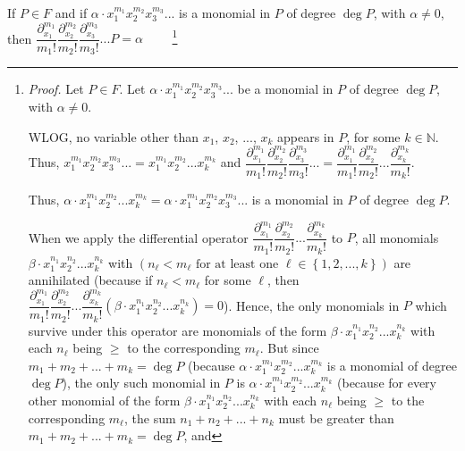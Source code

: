 \documentclass[etingof-lie.tex]{subfiles}
\begin{document}
\begin{vershort}
If $P\in F$ and if $\alpha\cdot x_{1}^{m_{1}}x_{2}^{m_{2}}x_{3}^{m_{3}}...$ is
a monomial in $P$ of degree $\deg P$, with $\alpha\neq0$, then $\dfrac
{\partial_{x_{1}}^{m_{1}}}{m_{1}!}\dfrac{\partial_{x_{2}}^{m_{2}}}{m_{2}%
!}\dfrac{\partial_{x_{3}}^{m_{3}}}{m_{3}!}...P=\alpha$%
\ \ \ \ \footnote{\textit{Proof.} Let $P\in F$. Let $\alpha\cdot x_{1}^{m_{1}%
}x_{2}^{m_{2}}x_{3}^{m_{3}}...$ be a monomial in $P$ of degree $\deg P$, with
$\alpha\neq0$.
\par
WLOG, no variable other than $x_{1}$, $x_{2}$, $...$, $x_{k}$ appears in $P$,
for some $k\in\mathbb{N}$. Thus, $x_{1}^{m_{1}}x_{2}^{m_{2}}x_{3}^{m_{3}%
}...=x_{1}^{m_{1}}x_{2}^{m_{2}}...x_{k}^{m_{k}}$ and $\dfrac{\partial_{x_{1}%
}^{m_{1}}}{m_{1}!}\dfrac{\partial_{x_{2}}^{m_{2}}}{m_{2}!}\dfrac
{\partial_{x_{3}}^{m_{3}}}{m_{3}!}...=\dfrac{\partial_{x_{1}}^{m_{1}}}{m_{1}%
!}\dfrac{\partial_{x_{2}}^{m_{2}}}{m_{2}!}...\dfrac{\partial_{x_{k}}^{m_{k}}%
}{m_{k}!}$.
\par
Thus, $\alpha\cdot x_{1}^{m_{1}}x_{2}^{m_{2}}...x_{k}^{m_{k}}=\alpha\cdot
x_{1}^{m_{1}}x_{2}^{m_{2}}x_{3}^{m_{3}}...$ is a monomial in $P$ of degree
$\deg P$.
\par
When we apply the differential operator $\dfrac{\partial_{x_{1}}^{m_{1}}%
}{m_{1}!}\dfrac{\partial_{x_{2}}^{m_{2}}}{m_{2}!}...\dfrac{\partial_{x_{k}%
}^{m_{k}}}{m_{k}!}$ to $P$, all monomials $\beta\cdot x_{1}^{n_{1}}%
x_{2}^{n_{2}}...x_{k}^{n_{k}}$ with $\left(  n_{\ell}<m_{\ell}\text{ for at
least one }\ell\in\left\{  1,2,...,k\right\}  \right)  $ are annihilated
(because if $n_{\ell}<m_{\ell}$ for some $\ell$, then $\dfrac{\partial_{x_{1}%
}^{m_{1}}}{m_{1}!}\dfrac{\partial_{x_{2}}^{m_{2}}}{m_{2}!}...\dfrac
{\partial_{x_{k}}^{m_{k}}}{m_{k}!}\left(  \beta\cdot x_{1}^{n_{1}}x_{2}%
^{n_{2}}...x_{k}^{n_{k}}\right)  =0$). Hence, the only monomials in $P$ which
survive under this operator are monomials of the form $\beta\cdot x_{1}%
^{n_{1}}x_{2}^{n_{2}}...x_{k}^{n_{k}}$ with each $n_{\ell}$ being $\geq$ to
the corresponding $m_{\ell}$. But since $m_{1}+m_{2}+...+m_{k}=\deg P$
(because $\alpha\cdot x_{1}^{m_{1}}x_{2}^{m_{2}}...x_{k}^{m_{k}}$ is a
monomial of degree $\deg P$), the only such monomial in $P$ is $\alpha\cdot
x_{1}^{m_{1}}x_{2}^{m_{2}}...x_{k}^{m_{k}}$ (because for every other monomial
of the form $\beta\cdot x_{1}^{n_{1}}x_{2}^{n_{2}}...x_{k}^{n_{k}}$ with each
$n_{\ell}$ being $\geq$ to the corresponding $m_{\ell}$, the sum $n_{1}%
+n_{2}+...+n_{k}$ must be greater than $m_{1}+m_{2}+...+m_{k}=\deg P$, and
}
\end{vershort}
\end{document}
